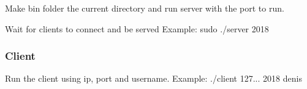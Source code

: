\begin{DoxyEnumerate}
\item Make bin folder the current directory and run server with the port to run.
\item Wait for clients to connect and be served Example\+: {\ttfamily sudo ./server 2018}
\end{DoxyEnumerate}

\subsubsection*{Client}


\begin{DoxyEnumerate}
\item Run the client using ip, port and username. Example\+: {\ttfamily ./client 127... 2018 denis} 
\end{DoxyEnumerate}